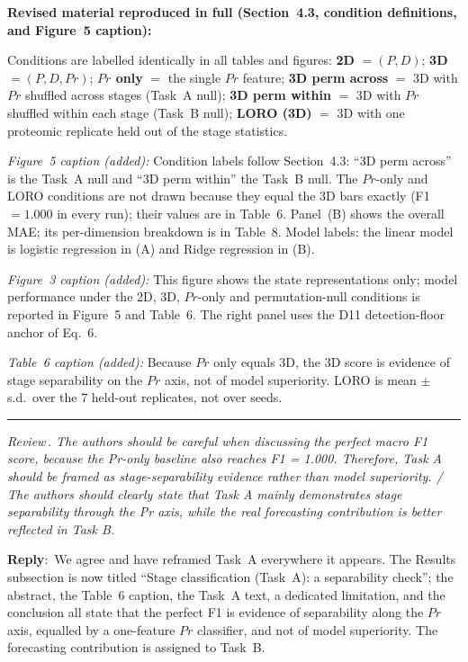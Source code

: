 \documentclass[11pt]{article}
\newcounter{reviewer}
\newcounter{point}[reviewer]
\renewcommand{\thepoint}{Review\,\thereviewer.\arabic{point}}
\newcommand{\point}[1]{\refstepcounter{point}  \bigskip \hrule \medskip \noindent \textit{{\fontseries{b}\selectfont \thepoint } #1}\par}
\newcommand{\reply}{\medskip \noindent \textbf{Reply}:\ }
\newcommand{\revisedheading}[1]{\medskip\noindent\textbf{Revised material
  reproduced in full (#1):}\par}
\newenvironment{revised}{\par\color{red}}{\par}
\begin{document}
\revisedheading{Section~4.3, condition definitions, and Figure~5 caption}
\begin{revised}
Conditions are labelled identically in all tables and figures: \textbf{2D} $=(P,D)$; \textbf{3D} $=(P,D,Pr)$; \textbf{$Pr$ only} $=$ the single $Pr$ feature; \textbf{3D perm across} $=$ 3D with $Pr$ shuffled across stages (Task~A null); \textbf{3D perm within} $=$ 3D with $Pr$ shuffled within each stage (Task~B null); \textbf{LORO (3D)} $=$ 3D with one proteomic replicate held out of the stage statistics.

\textit{Figure~5 caption (added):} Condition labels follow Section~4.3: ``3D perm across'' is the Task~A null and ``3D perm within'' the Task~B null. The $Pr$-only and LORO conditions are not drawn because they equal the 3D bars exactly (F1 $= 1.000$ in every run); their values are in Table~6. Panel~(B) shows the overall MAE; its per-dimension breakdown is in Table~8. Model labels: the linear model is logistic regression in (A) and Ridge regression in (B).

\textit{Figure~3 caption (added):} This figure shows the state representations only; model performance under the 2D, 3D, $Pr$-only and permutation-null conditions is reported in Figure~5 and Table~6. The right panel uses the D11 detection-floor anchor of Eq.~6.

\textit{Table~6 caption (added):} Because $Pr$ only equals 3D, the 3D score is evidence of stage separability on the $Pr$ axis, not of model superiority. LORO is mean $\pm$ s.d.\ over the 7 held-out replicates, not over seeds.
\end{revised}

\point{ The authors should be careful when discussing the perfect macro F1 score, because the Pr-only baseline also reaches F1 = 1.000. Therefore, Task A should be framed as stage-separability evidence rather than model superiority. / The authors should clearly state that Task A mainly demonstrates stage separability through the Pr axis, while the real forecasting contribution is better reflected in Task B.}

\reply{We agree and have reframed Task~A everywhere it appears. The Results subsection is now titled ``Stage classification (Task~A): a separability check''; the abstract, the Table~6 caption, the Task~A text, a dedicated limitation, and the conclusion all state that the perfect F1 is evidence of separability along the $Pr$ axis, equalled by a one-feature $Pr$ classifier, and not of model superiority. The forecasting contribution is assigned to Task~B.}
\end{document}
